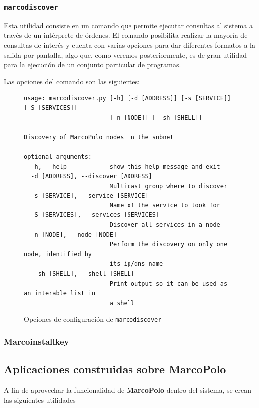 \subsubsection{\texttt{marcodiscover}}
\label{marcodiscover}
Esta utilidad consiste en un comando que permite ejecutar consultas al sistema a través de un intérprete de órdenes. El comando posibilita realizar la mayoría de consultas de interés y cuenta con varias opciones para dar diferentes formatos a la salida por pantalla, algo que, como veremos posteriormente, es de gran utilidad para la ejecución de un conjunto particular de programas.

Las opciones del comando son las siguientes:

\begin{figure}[H]
\centering
\begin{lstlisting}
usage: marcodiscover.py [-h] [-d [ADDRESS]] [-s [SERVICE]] [-S [SERVICES]]
                        [-n [NODE]] [--sh [SHELL]]

Discovery of MarcoPolo nodes in the subnet

optional arguments:
  -h, --help            show this help message and exit
  -d [ADDRESS], --discover [ADDRESS]
                        Multicast group where to discover
  -s [SERVICE], --service [SERVICE]
                        Name of the service to look for
  -S [SERVICES], --services [SERVICES]
                        Discover all services in a node
  -n [NODE], --node [NODE]
                        Perform the discovery on only one node, identified by
                        its ip/dns name
  --sh [SHELL], --shell [SHELL]
                        Print output so it can be used as an interable list in
                        a shell

\end{lstlisting}
\caption{Opciones de configuración de \texttt{marcodiscover}}
\label{fig:marcodiscover_help}
\end{figure}

\subsubsection{Marcoinstallkey}
\label{marcoinstallkey}

\subsection{Aplicaciones construidas sobre MarcoPolo}

A fin de aprovechar la funcionalidad de \textbf{MarcoPolo} dentro del sistema, se crean las siguientes utilidades

